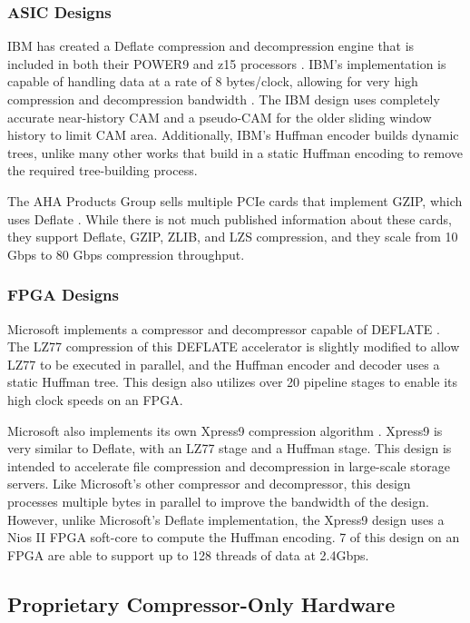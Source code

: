 \documentclass[doublespace,nopageskip]{VTthesis}
\begin{document}
\subsubsection{ASIC Designs}\label{sss:asic_designs}
IBM has created a Deflate compression and decompression engine that is included in both their POWER9 and z15 processors \cite{ibm}. IBM's implementation is capable of handling data at a rate of 8 bytes/clock, allowing for very high compression and decompression bandwidth \cite{ibm}. The IBM design uses completely accurate near-history CAM and a pseudo-CAM for the older sliding window history to limit CAM area. Additionally, IBM's Huffman encoder builds dynamic trees, unlike many other works that build in a static Huffman encoding to remove the required tree-building process.

The AHA Products Group sells multiple PCIe cards that implement GZIP, which uses Deflate \cite{aha}. While there is not much published information about these cards, they support Deflate, GZIP, ZLIB, and LZS compression, and they scale from 10 Gbps to 80 Gbps compression throughput.

\subsubsection{FPGA Designs}\label{sss:fpga_designs}

Microsoft implements a compressor and decompressor capable of DEFLATE \cite{microsoft}. The LZ77 compression of this DEFLATE accelerator is slightly modified to allow LZ77 to be executed in parallel, and the Huffman encoder and decoder uses a static Huffman tree. This design also utilizes over 20 pipeline stages to enable its high clock speeds on an FPGA.

Microsoft also implements its own Xpress9 compression algorithm \cite{xpress9}. Xpress9 is very similar to Deflate, with an LZ77 stage and a Huffman stage. This design is intended to accelerate file compression and decompression in large-scale storage servers. Like Microsoft's other compressor and decompressor, this design processes multiple bytes in parallel to improve the bandwidth of the design. However, unlike Microsoft's Deflate implementation, the Xpress9 design uses a Nios II FPGA soft-core to compute the Huffman encoding. 7 of this design on an FPGA are able to support up to 128 threads of data at 2.4Gbps.

\subsection{Proprietary Compressor-Only Hardware}\label{proprietary_compressor-only_hardware}
\end{document}
